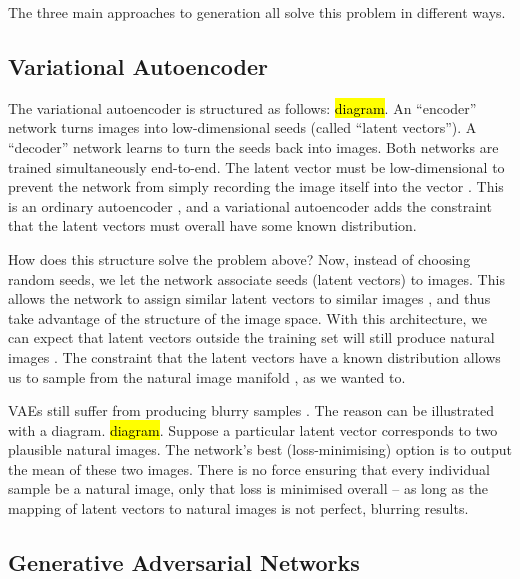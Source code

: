 \documentclass[10pt,a4paper]{article}
\newcommand{\nquote}[1]{``{#1}''}
\begin{document}
The three main approaches to generation all solve this problem in different ways.

\subsection{Variational Autoencoder}

The variational autoencoder \cite{vae} is structured as follows: \hl{diagram}. An \nquote{encoder} network turns images into low-dimensional seeds (called \nquote{latent vectors}). A \nquote{decoder} network learns to turn the seeds back into images. Both networks are trained simultaneously end-to-end. The latent vector must be low-dimensional to prevent the network from simply recording the image itself into the vector \cite{??}. This is an ordinary autoencoder \cite{??}, and a variational autoencoder \cite{vae} adds the constraint that the latent vectors must overall have some known distribution.

How does this structure solve the problem above? Now, instead of choosing random seeds, we let the network associate seeds (latent vectors) to images. This allows the network to assign similar latent vectors to similar images \cite{??}, and thus take advantage of the structure of the image space. With this architecture, we can expect that latent vectors outside the training set will still produce natural images \cite{??}. The constraint that the latent vectors have a known distribution allows us to sample from the natural image manifold \cite{??}, as we wanted to.

VAEs still suffer from producing blurry samples \cite{vaeunderstanding}. The reason can be illustrated with a diagram. \hl{diagram}. Suppose a particular latent vector corresponds to two plausible natural images. The network's best (loss-minimising) option is to output the mean of these two images. There is no force ensuring that every individual sample be a natural image, only that loss is minimised overall -- as long as the mapping of latent vectors to natural images is not perfect, blurring results.

\subsection{Generative Adversarial Networks}
\end{document}
